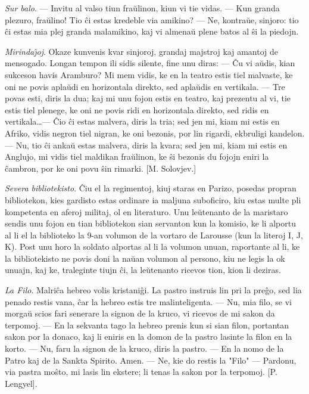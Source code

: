 \emph{Sur balo}. --- Invitu al valso tiun fra\u ulinon, kiun vi tie
vidas. --- Kun granda plezuro, fra\u ulino! Tio \^ci estas kredeble
via amikino? --- Ne, kontra\u ue, sinjoro: tio \^ci estas mia plej
granda malamikino, kaj vi almena\u u plene batos al \^si la piedojn.

\emph{Mirinda\^{\j}oj}. Okaze kunvenis kvar sinjoroj, grandaj
majstroj kaj amantoj de mensogado. Longan tempon ili sidis silente,
fine unu diras: --- \^Cu vi a\u udis, kian sukceson havis Aramburo?
Mi mem vidis, ke en la teatro estis tiel malvaste, ke oni ne povis
apla\u udi en horizontala direkto, sed apla\u udis en vertikala. ---
Tre povas esti, diris la dua; kaj mi unu fojon estis en teatro, kaj
prezentu al vi, tie estis tiel plenege, ke oni ne povis ridi en
horizontala direkto, sed ridis en vertikala\dots --- \^Cio \^ci
estas malvera, diris la tria; sed jen mi, kiam mi estis en Afriko,
vidis negron tiel nigran, ke oni bezonis, por lin rigardi, ekbruligi
kandelon. --- Nu, tio \^ci anka\u u estas malvera, diris la kvara;
sed jen mi, kiam mi estis en Anglujo, mi vidis tiel maldikan fra\u
ulinon, ke \^si bezonis du fojojn eniri la \^cambron, por ke oni
povu \^sin rimarki. [M. Solovjev.]

\emph{Severa bibliotekisto}. \^Ciu el la regimentoj, kiuj staras en
Parizo, posedas propran bibliotekon, kies gardisto estas ordinare ia
maljuna suboficiro, kiu estas multe pli kompetenta en aferoj
militaj, ol en literaturo. Unu le\u utenanto de la maristaro sendis
unu fojon en tian bibliotekon sian servanton kun la komisio, ke li
alportu al li el la biblioteko la 9-an volumon de la vortaro de
Larousse (kun la literoj I, J, K). Post unu horo la soldato alportas
al li la volumon unuan, raportante al li, ke la bibliotekisto ne
povis doni la na\u uan volumon al persono, kiu ne legis la ok
unuajn, kaj ke, traleginte tiujn \^ci, la le\u utenanto ricevos
tion, kion li deziras.

\emph{La Filo}. Malri\^ca hebreo volis kristani\^gi. La pastro
instruis lin pri la pre\^go, sed lia penado restis vana, \^car la
hebreo estis tre malinteligenta. --- Nu, mia filo, se vi morga\u u
scios fari senerare la signon de la kruco, vi ricevos de mi sakon da
terpomoj. --- En la sekvanta tago la hebreo prenis kun si sian
filon, portantan sakon por la donaco, kaj li eniris en la domon de
la pastro lasinte la filon en la korto. --- Nu, faru la signon de la
kruco, diris la pastro. --- En la nomo de la Patro kaj de la Sankta
Spirito. Amen. --- Ne, kie do restis la "Filo" --- Pardonu, via
pastra mo\^sto, mi lasis lin ekstere; li tenas la sakon por la
terpomoj. [P. Lengyel].

